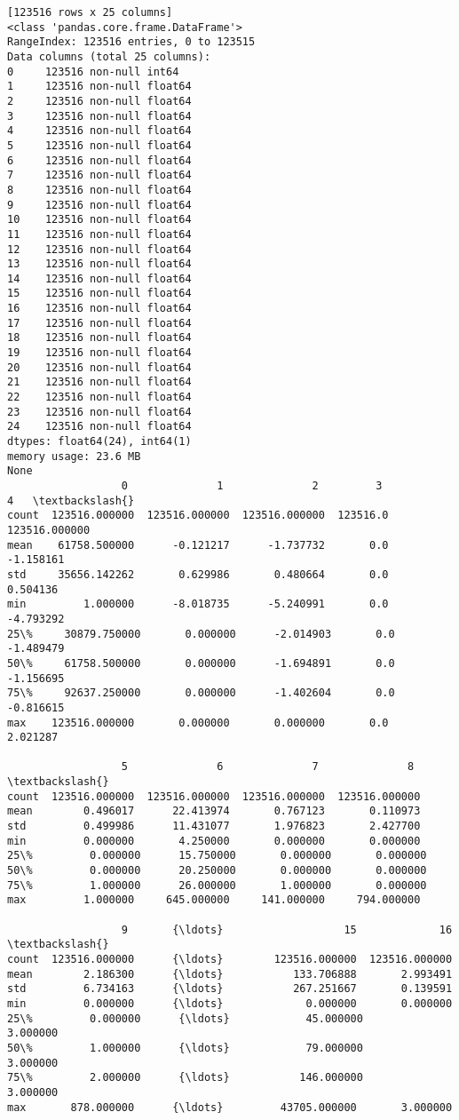 \documentclass[11pt]{article}
\begin{document}
\begin{Verbatim}[commandchars=\\\{\}]
[123516 rows x 25 columns]
<class 'pandas.core.frame.DataFrame'>
RangeIndex: 123516 entries, 0 to 123515
Data columns (total 25 columns):
0     123516 non-null int64
1     123516 non-null float64
2     123516 non-null float64
3     123516 non-null float64
4     123516 non-null float64
5     123516 non-null float64
6     123516 non-null float64
7     123516 non-null float64
8     123516 non-null float64
9     123516 non-null float64
10    123516 non-null float64
11    123516 non-null float64
12    123516 non-null float64
13    123516 non-null float64
14    123516 non-null float64
15    123516 non-null float64
16    123516 non-null float64
17    123516 non-null float64
18    123516 non-null float64
19    123516 non-null float64
20    123516 non-null float64
21    123516 non-null float64
22    123516 non-null float64
23    123516 non-null float64
24    123516 non-null float64
dtypes: float64(24), int64(1)
memory usage: 23.6 MB
None
                  0              1              2         3              4   \textbackslash{}
count  123516.000000  123516.000000  123516.000000  123516.0  123516.000000   
mean    61758.500000      -0.121217      -1.737732       0.0      -1.158161   
std     35656.142262       0.629986       0.480664       0.0       0.504136   
min         1.000000      -8.018735      -5.240991       0.0      -4.793292   
25\%     30879.750000       0.000000      -2.014903       0.0      -1.489479   
50\%     61758.500000       0.000000      -1.694891       0.0      -1.156695   
75\%     92637.250000       0.000000      -1.402604       0.0      -0.816615   
max    123516.000000       0.000000       0.000000       0.0       2.021287   

                  5              6              7              8   \textbackslash{}
count  123516.000000  123516.000000  123516.000000  123516.000000   
mean        0.496017      22.413974       0.767123       0.110973   
std         0.499986      11.431077       1.976823       2.427700   
min         0.000000       4.250000       0.000000       0.000000   
25\%         0.000000      15.750000       0.000000       0.000000   
50\%         0.000000      20.250000       0.000000       0.000000   
75\%         1.000000      26.000000       1.000000       0.000000   
max         1.000000     645.000000     141.000000     794.000000   

                  9       {\ldots}                   15             16  \textbackslash{}
count  123516.000000      {\ldots}        123516.000000  123516.000000   
mean        2.186300      {\ldots}           133.706888       2.993491   
std         6.734163      {\ldots}           267.251667       0.139591   
min         0.000000      {\ldots}             0.000000       0.000000   
25\%         0.000000      {\ldots}            45.000000       3.000000   
50\%         1.000000      {\ldots}            79.000000       3.000000   
75\%         2.000000      {\ldots}           146.000000       3.000000   
max       878.000000      {\ldots}         43705.000000       3.000000   


\end{Verbatim}
\end{document}

